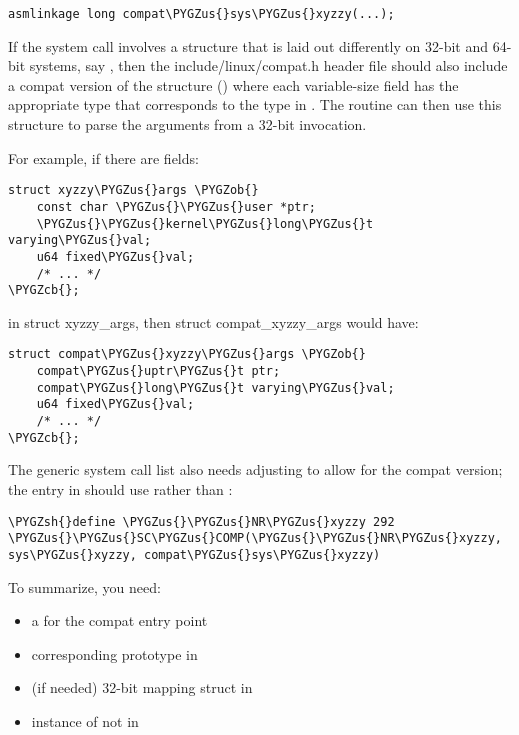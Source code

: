\documentclass[a4paper,8pt,english]{sphinxmanual}
\def\PYGZus{\char`\_}
\def\PYGZob{\char`\{}
\def\PYGZcb{\char`\}}
\def\PYGZsh{\char`\#}
\begin{document}
\begin{Verbatim}[commandchars=\\\{\}]
asmlinkage long compat\PYGZus{}sys\PYGZus{}xyzzy(...);
\end{Verbatim}

If the system call involves a structure that is laid out differently on 32-bit
and 64-bit systems, say , then the include/linux/compat.h
header file should also include a compat version of the structure () where each variable-size field has the appropriate
 type that corresponds to the type in .  The
 routine can then use this  structure to
parse the arguments from a 32-bit invocation.

For example, if there are fields:

\begin{Verbatim}[commandchars=\\\{\}]
struct xyzzy\PYGZus{}args \PYGZob{}
    const char \PYGZus{}\PYGZus{}user *ptr;
    \PYGZus{}\PYGZus{}kernel\PYGZus{}long\PYGZus{}t varying\PYGZus{}val;
    u64 fixed\PYGZus{}val;
    /* ... */
\PYGZcb{};
\end{Verbatim}

in struct xyzzy\_args, then struct compat\_xyzzy\_args would have:

\begin{Verbatim}[commandchars=\\\{\}]
struct compat\PYGZus{}xyzzy\PYGZus{}args \PYGZob{}
    compat\PYGZus{}uptr\PYGZus{}t ptr;
    compat\PYGZus{}long\PYGZus{}t varying\PYGZus{}val;
    u64 fixed\PYGZus{}val;
    /* ... */
\PYGZcb{};
\end{Verbatim}

The generic system call list also needs adjusting to allow for the compat
version; the entry in  should use
 rather than :

\begin{Verbatim}[commandchars=\\\{\}]
\PYGZsh{}define \PYGZus{}\PYGZus{}NR\PYGZus{}xyzzy 292
\PYGZus{}\PYGZus{}SC\PYGZus{}COMP(\PYGZus{}\PYGZus{}NR\PYGZus{}xyzzy, sys\PYGZus{}xyzzy, compat\PYGZus{}sys\PYGZus{}xyzzy)
\end{Verbatim}

To summarize, you need:
\begin{itemize}
\item {} 
a  for the compat entry point

\item {} 
corresponding prototype in 

\item {} 
(if needed) 32-bit mapping struct in 

\item {} 
instance of  not  in

\end{itemize}
\end{document}
